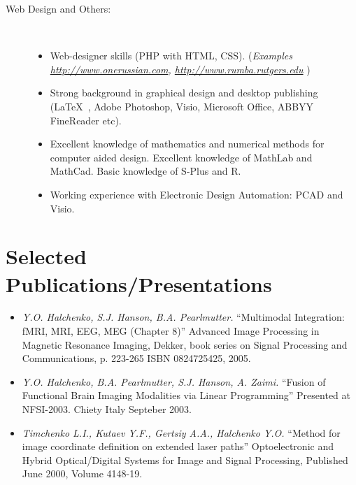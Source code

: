 \documentclass[10pt,overlapped,line]{res}
\newcommand{\wdescription}[1]{({\small \textit{#1}})}
\newcommand{\mtitle}[1]{``#1''}
\newcommand{\mauthors}[1]{ \textit{#1.}}
\newcommand{\mwhere}[1]{#1.}
\begin{document}
\begin{resume}
\begin{description}
    \item[Web Design and Others:]  \hspace*{\fill} \\
      \begin{itemize}
      \item Web-designer skills (PHP with HTML, CSS).
        \wdescription{Examples
          \href{URL}{http://www.onerussian.com},
          \href{URL}{http://www.rumba.rutgers.edu}
}
      \item Strong background in graphical design and desktop
        publishing (\LaTeX\ , Adobe Photoshop, Visio, Microsoft Office, ABBYY
        FineReader etc).
      \item Excellent knowledge of mathematics and numerical methods
        for computer aided design. Excellent knowledge of MathLab and
        MathCad. Basic knowledge of S-Plus and R.
      \item Working experience with Electronic Design Automation: PCAD and
        Visio.
      \end{itemize}
  \end{description}

 \section{Selected Publications/Presentations}

 \begin{itemize}
  \item

    \mauthors{Y.O. Halchenko, S.J. Hanson, B.A. Pearlmutter}
    \mtitle{Multimodal Integration: fMRI, MRI, EEG, MEG (Chapter 8)}
    \mwhere{Advanced Image Processing in Magnetic Resonance Imaging,
      Dekker, book series on Signal Processing and Communications, p. 223-265
      ISBN 0824725425, 2005}

  \item
     \mauthors{Y.O. Halchenko, B.A. Pearlmutter, S.J. Hanson, A. Zaimi}
     \mtitle{Fusion of Functional Brain Imaging Modalities via Linear Programming}
     \mwhere{Presented at NFSI-2003. Chiety Italy Septeber 2003}

  \item
     \mauthors{Timchenko L.I., Kutaev Y.F., Gertsiy A.A., Halchenko Y.O}
     \mtitle{Method for image coordinate definition on extended laser paths}
     \mwhere{Optoelectronic and Hybrid Optical/Digital Systems for Image and Signal Processing, Published June 2000,  Volume 4148-19}


\end{itemize}
\end{resume}
\end{document}

